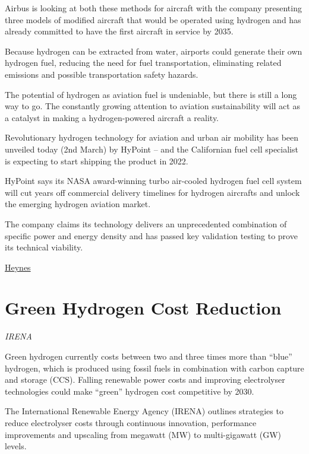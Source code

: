 \documentclass[
]{book}
\begin{document}
Airbus is looking at both these methods for aircraft with the company presenting three models of modified aircraft that would be operated using hydrogen and has already committed to have the first aircraft in service by 2035.

Because hydrogen can be extracted from water, airports could generate their own hydrogen fuel, reducing the need for fuel transportation, eliminating related emissions and possible transportation safety hazards.

The potential of hydrogen as aviation fuel is undeniable, but there is still a long way to go. The constantly growing attention to aviation sustainability will act as a catalyst in making a hydrogen-powered aircraft a reality.

Revolutionary hydrogen technology for aviation and urban air mobility has been unveiled today (2nd March) by HyPoint -- and the Californian fuel cell specialist is expecting to start shipping the product in 2022.

HyPoint says its NASA award-winning turbo air-cooled hydrogen fuel cell system will cut years off commercial delivery timelines for hydrogen aircrafts and unlock the emerging hydrogen aviation market.

The company claims its technology delivers an unprecedented combination of specific power and energy density and has passed key validation testing to prove its technical viability.

\href{https://www.h2-view.com/story/hydrogen-aviation-projected-to-be-worth-174bn-by-2040/}{Heynes}

\hypertarget{green-hydrogen-cost-reduction}{%
\section{Green Hydrogen Cost Reduction}\label{green-hydrogen-cost-reduction}}

\emph{IRENA}

Green hydrogen currently costs between two and three times more than ``blue'' hydrogen, which is produced using fossil fuels in combination with carbon capture and storage (CCS).
Falling renewable power costs and improving electrolyser technologies could make ``green'' hydrogen cost competitive by 2030.

The International Renewable Energy Agency (IRENA) outlines strategies to reduce electrolyser costs through continuous innovation, performance improvements and upscaling from megawatt (MW) to multi-gigawatt (GW) levels.
\end{document}
